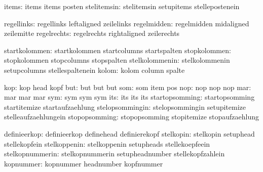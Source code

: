                         items:  items                        items
                                posten
                  stelitemsin:  stelitemsin                  setupitems
                                stellepostenein

                   regellinks:  regellinks                   leftaligned
                                zeilelinks  %
                  regelmidden:  regelmidden                  midaligned
                                zeilemitte  %
                  regelrechts:  regelrechts                  rightaligned
                                zeilerechts %

                startkolommen:  startkolommen                startcolumns
                                startspalten
                 stopkolommen:  stopkolommen                 stopcolumns
                                stopspalten
               stelkolommenin:  stelkolommenin               setupcolumns
                                stellespaltenein
                        kolom:  kolom                        column
                                spalte

                          kop:  kop                          head
                                kopf
                          but:  but                          but
                                but
                          som:  som                          item
                                pos
                          nop:  nop                          nop
                                nop
                          mar:  mar                          mar
                                mar
                          sym:  sym                          sym
                                sym
                          its:  its                          its
                                its
               startopsomming:  startopsomming               startitemize
                                startaufzaehlung
              stelopsommingin:  stelopsommingin              setupitemize
                                stelleaufzaehlungein
                stopopsomming:  stopopsomming                stopitemize
                                stopaufzaehlung

                 definieerkop:  definieerkop                 definehead
                                definierekopf
                    stelkopin:  stelkopin                    setuphead
                                stellekopfein
                 stelkoppenin:  stelkoppenin                 setupheads
                                stellekoepfeein
              stelkopnummerin:  stelkopnummerin              setupheadnumber
                                stellekopfzahlein
                    kopnummer:  kopnummer                    headnumber
                                kopfnummer


